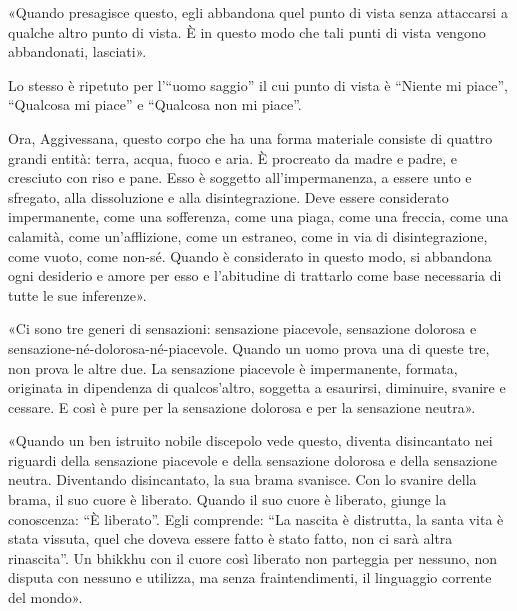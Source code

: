 «Quando presagisce questo, egli abbandona quel punto di vista senza attaccarsi a
qualche altro punto di vista. È in questo modo che tali punti di vista vengono
abbandonati, lasciati».

 Lo stesso è ripetuto per l’“uomo saggio” il cui
punto di vista è “Niente mi piace”, “Qualcosa mi piace” e “Qualcosa non mi
piace”.

 Ora, Aggivessana, questo corpo che ha una forma materiale
consiste di quattro grandi entità: terra, acqua, fuoco e aria. È procreato da
madre e padre, e cresciuto con riso e pane. Esso è soggetto all’impermanenza, a
essere unto e sfregato, alla dissoluzione e alla disintegrazione. Deve essere
considerato impermanente, come una sofferenza, come una piaga, come una freccia,
come una calamità, come un’afflizione, come un estraneo, come in via di
disintegrazione, come vuoto, come non-sé. Quando è considerato in questo modo,
si abbandona ogni desiderio e amore per esso e l’abitudine di trattarlo come
base necessaria di tutte le sue inferenze».

«Ci sono tre generi di sensazioni: sensazione piacevole, sensazione dolorosa e
sensazione-né-dolorosa-né-piacevole. Quando un uomo prova una di queste tre, non
prova le altre due. La sensazione piacevole è impermanente, formata, originata
in dipendenza di qualcos’altro, soggetta a esaurirsi, diminuire, svanire e
cessare. E così è pure per la sensazione dolorosa e per la sensazione neutra».

«Quando un ben istruito nobile discepolo vede questo, diventa disincantato nei
riguardi della sensazione piacevole e della sensazione dolorosa e della
sensazione neutra. Diventando disincantato, la sua brama svanisce. Con lo
svanire della brama, il suo cuore è liberato. Quando il suo cuore è liberato,
giunge la conoscenza: “È liberato”. Egli comprende: “La nascita è distrutta, la
santa vita è stata vissuta, quel che doveva essere fatto è stato fatto, non ci
sarà altra rinascita”. Un bhikkhu con il cuore così liberato non parteggia per
nessuno, non disputa con nessuno e utilizza, ma senza fraintendimenti, il
linguaggio corrente del mondo».

